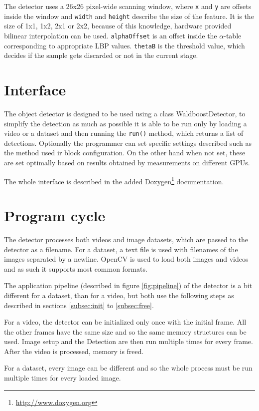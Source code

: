 The detector uses a 26x26 pixel-wide scanning window, where \verb|x| and \verb|y| are offsets inside the window and \verb|width| and \verb|height| describe the size of the feature. It is the size of 1x1, 1x2, 2x1 or 2x2, because of this knowledge, hardware provided bilinear interpolation can be used. \verb|alphaOffset| is an offset inside the $\alpha$-table corresponding to appropriate LBP values. \verb|thetaB| is the threshold value, which decides if the sample gets discarded or not in the current stage.

\section{Interface}

The object detector is designed to be used using a class WaldboostDetector, to simplify the detection as much as possible it is able to be run only by loading a video or a dataset and then running the \verb|run()| method, which returns a list of detections. Optionally the programmer can set specific settings described such as the method used ir block configuration. On the other hand when not set, these are set optimally based on results obtained by measurements on different GPUs.

The whole interface is described in the added Doxygen\footnote{\url{http://www.doxygen.org}} documentation.

\section{Program cycle}

The detector processes both videos and image datasets, which are passed to the detector as a filename. For a dataset, a text file is used with filenames of the images separated by a newline. OpenCV is used to load both images and videos and as such it supports most common formats.

The application pipeline (described in figure \ref{fig:pipeline}) of the detector is a bit different for a dataset, than for a video, but both use the following steps as described in sections \ref{subsec:init} to \ref{subsec:free}.

For a video, the detector can be initialized only once with the initial frame. All the other frames have the same size and so the same memory structures can be used. Image setup and the Detection are then run multiple times for every frame. After the video is processed, memory is freed.

For a dataset, every image can be different and so the whole process must be run multiple times for every loaded image.

